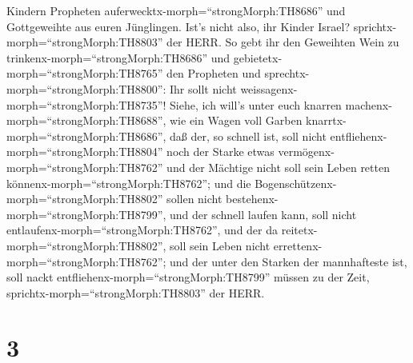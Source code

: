 Kindern Propheten auferwecktx-morph=``strongMorph:TH8686'' und
Gottgeweihte aus euren Jünglingen. Ist's nicht also, ihr Kinder Israel?
sprichtx-morph=``strongMorph:TH8803'' der HERR.  So gebt
ihr den Geweihten Wein zu trinkenx-morph=``strongMorph:TH8686'' und
gebietetx-morph=``strongMorph:TH8765'' den Propheten und
sprechtx-morph=``strongMorph:TH8800'': Ihr sollt nicht
weissagenx-morph=``strongMorph:TH8735''!  Siehe, ich will's
unter euch knarren machenx-morph=``strongMorph:TH8688'', wie ein Wagen
voll Garben knarrtx-morph=``strongMorph:TH8686'',  daß der,
so schnell ist, soll nicht entfliehenx-morph=``strongMorph:TH8804'' noch
der Starke etwas vermögenx-morph=``strongMorph:TH8762'' und der Mächtige
nicht soll sein Leben retten könnenx-morph=``strongMorph:TH8762'';
 und die Bogenschützenx-morph=``strongMorph:TH8802'' sollen
nicht bestehenx-morph=``strongMorph:TH8799'', und der schnell laufen
kann, soll nicht entlaufenx-morph=``strongMorph:TH8762'', und der da
reitetx-morph=``strongMorph:TH8802'', soll sein Leben nicht
errettenx-morph=``strongMorph:TH8762'';  und der unter den
Starken der mannhafteste ist, soll nackt
entfliehenx-morph=``strongMorph:TH8799'' müssen zu der Zeit,
sprichtx-morph=``strongMorph:TH8803'' der HERR.

\hypertarget{section-2}{%
\section{3}\label{section-2}}

